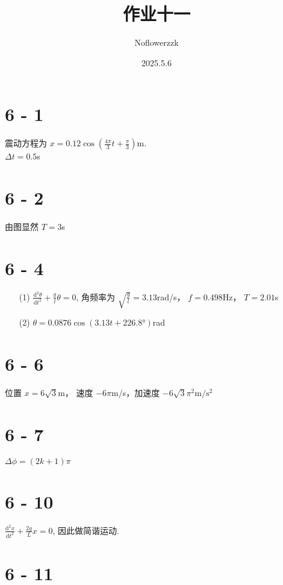\documentclass{article}
\title{作业十一}
\author{Noflowerzzk}
\date{2025.5.6}
\begin{document}
\maketitle

\section*{6 - 1}

震动方程为 $x = 0.12 \cos \left(\frac{4\pi}{3}t + \frac{\pi}{3}\right)$m. \\
$\Delta t = 0.5$s

\section*{6 - 2}

由图显然 $T = 3$s

\section*{6 - 4}

\begin{itemize}
    \item [(1)] $\frac{\mathrm{d}^2\theta}{\mathrm{d}t^2} + \frac{g}{l}\theta = 0$, 角频率为 $\sqrt{\frac{g}{l}} = 3.13$rad/s， $f = 0.498$Hz， $T = 2.01$s
    \item [(2)] $\theta = 0.0876\cos \left(3.13t + 226.8°\right)$rad
\end{itemize}

\section*{6 - 6}

位置 $x = 6\sqrt{3}$m， 速度 $-6\pi$m/s，加速度 $-6\sqrt{3}\pi^2 \mathrm{m/s^2}$

\section*{6 - 7}

$\Delta \phi = (2k + 1)\pi$

\section*{6 - 10}

$\frac{\mathrm{d}^2x}{\mathrm{d}t^2} + \frac{2g}{L}x = 0$, 因此做简谐运动.

\section*{6 - 11}
\end{document}

